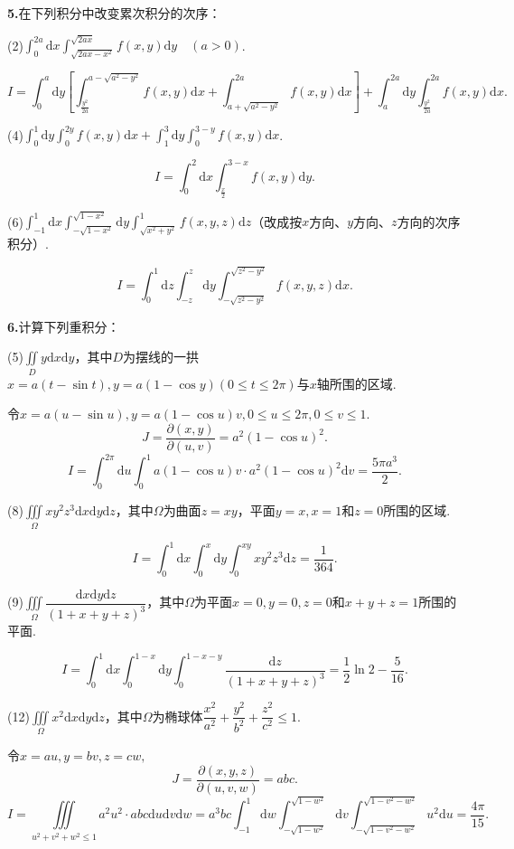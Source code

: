 \documentclass[12pt, a4paper]{article}
\newcommand{\dif}{\mathrm{d}}
\begin{document}
\textbf{5.}在下列积分中改变累次积分的次序：

(2)\(\int_{0}^{2a} \dif x \int_{\sqrt{2ax - x^2}}^{\sqrt{2ax}} f(x, y) \dif y \quad (a > 0)\).

\[I = \int_0^a \dif y \left[\int_{\frac{y^2}{2a}}^{a - \sqrt{a^2 - y^2}} f(x, y) \dif x + \int_{a + \sqrt{a^2 - y^2}}^{2a} f(x, y) \dif x\right] + \int_{a}^{2a} \dif y \int_{\frac{y^2}{2a}}^{2a} f(x, y) \dif x.\]

(4)\(\int_0^1 \dif y \int_{0}^{2y} f(x, y) \dif x + \int_1^3 \dif y \int_{0}^{3 - y} f(x, y) \dif x\).

\[I = \int_0^2 \dif x \int_{\frac{x}{2}}^{3 - x} f(x, y) \dif y.\]

(6)\(\int_{-1}^{1} \dif x \int_{-\sqrt{1 - x^2}}^{\sqrt{1 - x^2}} \dif y \int_{\sqrt{x^2 + y^2}}^{1} f(x, y, z) \dif z\)（改成按\(x\)方向、\(y\)方向、\(z\)方向的次序积分）.

\[I = \int_0^1 \dif z \int_{-z}^{z} \dif y \int_{-\sqrt{z^2 - y^2}}^{\sqrt{z^2 - y^2}} f(x, y, z) \dif x.\]

\textbf{6.}计算下列重积分：

(5)\(\iint\limits_D y \dif x \dif y\)，其中\(D\)为摆线的一拱\(x = a(t - \sin t), y = a(1 - \cos y)(0 \leq t \leq 2\pi)\)与\(x\)轴所围的区域.

令\(x = a(u - \sin u), y = a(1 - \cos u)v, 0 \leq u \leq 2\pi, 0 \leq v \leq 1.\)
\[J = \frac{\partial(x, y)}{\partial(u, v)} = a^2(1 - \cos u)^2.\]
\[I = \int_{0}^{2\pi} \dif u \int_0^1 a(1 - \cos u)v \cdot a^2(1 - \cos u)^2 \dif v = \frac{5\pi a^3}{2}.\]

(8)\(\iiint\limits_\Omega xy^2z^3 \dif x \dif y \dif z\)，其中\(\Omega\)为曲面\(z = xy\)，平面\(y = x, x = 1\)和\(z = 0\)所围的区域.

\[I = \int_0^1 \dif x \int_0^x \dif y \int_{0}^{xy} xy^2z^3 \dif z = \frac{1}{364}.\]

(9)\(\iiint\limits_\Omega \dfrac{\dif x \dif y \dif z}{(1 + x + y + z)^3}\)，其中\(\Omega\)为平面\(x = 0, y = 0, z = 0\)和\(x + y + z = 1\)所围的平面.

\[I = \int_0^1 \dif x \int_{0}^{1 - x} \dif y \int_{0}^{1 - x - y} \frac{\dif z}{(1 + x + y + z)^3} = \frac{1}{2} \ln 2 - \frac{5}{16}.\]

(12)\(\iiint\limits_\Omega x^2 \dif x \dif y \dif z\)，其中\(\Omega\)为椭球体\(\dfrac{x^2}{a^2} + \dfrac{y^2}{b^2} + \dfrac{z^2}{c^2} \leq 1\).

令\(x = au, y = bv, z = cw,\)
\[J = \frac{\partial(x, y, z)}{\partial(u, v, w)} = abc.\]
\[I = \iiint\limits_{u^2 + v^2 + w^2 \leq 1} a^2u^2 \cdot abc \dif u \dif v \dif w = a^3bc \int_{-1}^{1} \dif w \int_{-\sqrt{1 - w^2}}^{\sqrt{1 - w^2}} \dif v \int_{-\sqrt{1 - v^2 - w^2}}^{\sqrt{1 - v^2 - w^2}} u^2 \dif u = \frac{4\pi}{15}.\]
\end{document}
